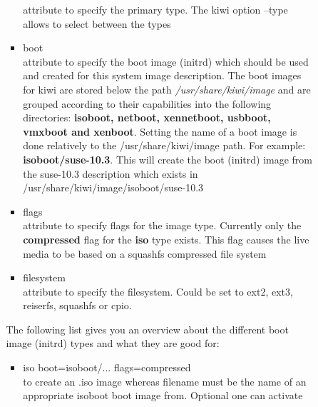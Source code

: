 \begin{itemize}
\begin{enumerate}
\begin{itemize}
\begin{itemize}
                              attribute to specify the primary type. The kiwi
							  option --type allows to select between the types
						\item boot\\
                              attribute to specify the boot image (initrd)
                              which should be used and created for this system
                              image description. The boot images for kiwi are
                              stored below the path 
                              \textit{/usr/share/kiwi/image} and are grouped
                              according to their capabilities into the following
                              directories: \textbf{isoboot, netboot, xennetboot,
                              usbboot, vmxboot and xenboot}. Setting the name
                              of a boot image is done relatively to the
                              /usr/share/kiwi/image path. For example:
                              \textbf{isoboot/suse-10.3}. This will create
                              the boot (initrd) image from the suse-10.3
                              description which exists in
                              /usr/share/kiwi/image/isoboot/suse-10.3
						\item flags\\
                              attribute to specify flags for the image type.
                              Currently only the \textbf{compressed} flag
                              for the \textbf{iso} type exists. This flag
                              causes the live media to be based on a
                              squashfs compressed file system
						\item filesystem\\
                              attribute to specify the filesystem. Could be
                              set to ext2, ext3, reiserfs, squashfs or cpio.
					\end{itemize}
					The following list gives you an overview about the
			        different boot image (initrd) types and what they are
                    good for:
                    \begin{itemize}
                        \item iso boot=isoboot/... flags=compressed\\
                              to create an .iso image whereas filename
                              must be the name of an appropriate isoboot
                              boot image from. Optional one can activate

\end{itemize}
\end{itemize}
\end{enumerate}
\end{itemize}
